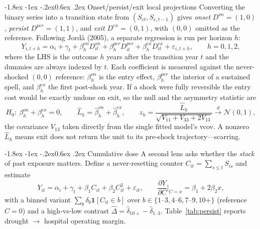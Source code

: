 \documentclass[11pt]{article}
\makeatletter
\renewcommand\subsection{\@startsection{subsection}{2}{\z@}%
  {-1.8ex \@plus -1ex \@minus -.2ex}{0.6ex \@plus .2ex}%
  {\normalfont\normalsize\bfseries}}
\newcommand{\Sct}{S_{ct}}
\makeatother
\begin{document}
\subsection{Onset/persist/exit local projections}
Converting the binary series into a transition state from $(\Sct,S_{c,t-1})$ gives
\emph{onset} $D^{on}\!=\!(1,0)$, \emph{persist} $D^{per}\!=\!(1,1)$, and \emph{exit}
$D^{ex}\!=\!(0,1)$, with $(0,0)$ omitted as the reference. Following Jord\`a (2005),
a separate regression is run per horizon $h$:
\begin{equation}
Y_{i,t+h}=\alpha_i+\gamma_t
   +\beta^{on}_h D^{on}_{it}+\beta^{per}_h D^{per}_{it}+\beta^{ex}_h D^{ex}_{it}
   +\varepsilon_{i,t+h},\qquad h=0,1,2,
\label{eq:lp}
\end{equation}
where the LHS is the outcome $h$ years after the transition year $t$ and the dummies
are always indexed by $t$. Each coefficient is measured against the never-shocked
$(0,0)$ reference: $\beta^{on}_h$ is the entry effect, $\beta^{per}_h$ the interior
of a sustained spell, and $\beta^{ex}_h$ the first post-shock year. If a shock were
fully reversible the entry cost would be exactly undone on exit, so the null and the
asymmetry statistic are
\begin{equation}
H_0:\ \beta^{on}_h+\beta^{ex}_h=0,
\qquad
\hat L_h=\hat\beta^{on}_h+\hat\beta^{ex}_h,
\qquad
z_h=\frac{\hat L_h}{\sqrt{V_{11}+V_{33}+2V_{13}}}\xrightarrow{d}\mathcal N(0,1),
\label{eq:sym}
\end{equation}
the covariance $V_{13}$ taken directly from the single fitted model's vcov.
A nonzero $\hat L_h$ means exit does not return the unit to its pre-shock
trajectory---scarring.

\subsection{Cumulative dose}
A second lens asks whether the \emph{stock} of past exposure matters. Define a
never-resetting counter $C_{it}=\sum_{s\le t}S_{is}$ and estimate
\begin{equation}
Y_{it}=\alpha_i+\gamma_t+\beta_1 C_{it}+\beta_2 C_{it}^2+\varepsilon_{it},
\qquad
\frac{\partial Y}{\partial C}\Big|_{C=x}=\beta_1+2\beta_2 x,
\label{eq:dose}
\end{equation}
with a binned variant $\sum_b\delta_b\mathbf 1[C_{it}\in b]$ over
$b\in\{1\text{--}3,4\text{--}6,7\text{--}9,10{+}\}$ (reference $C=0$) and a
high-vs-low contrast $\hat\Delta=\hat\delta_{10+}-\hat\delta_{1\text{--}3}$.
Table~\ref{tab:persist} reports drought $\to$ hospital operating margin.
\end{document}
